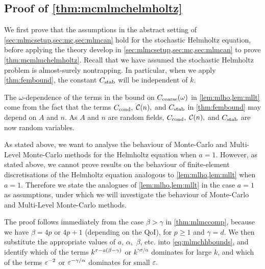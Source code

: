 \subsection{Proof of \cref{thm:mcmlmchelmholtz}}
We first prove that the assumptions in the abstract setting of \cref{sec:mlmcsetup,sec:mc,sec:mlmcan} hold for the stochastic Helmholtz equation, before applying the theory develop in \cref{sec:mlmcsetup,sec:mc,sec:mlmcan} to prove \cref{thm:mcmlmchelmholtz}. Recall that we have assumed the stochastic Helmholtz problem is almost-surely nontrapping. In particular, when we apply \cref{thm:fembound}, the constant $C_{\mathrm{stab}}$ will be independent of $k.$

The $\omega$-dependence of the terms in the bound on $C_{\mathrm{coarse}}(\omega)$ in \cref{lem:mlho,lem:mllt} come from the fact that the terms $C_{\mathrm{cond}},$ $\mathcal C(n),$ and $C_{\mathrm{stab}}$ in \cref{thm:fembound} may depend on $A$ and $n$. As $A$ and $n$ are random fields, $C_{\mathrm{cond}},$ $\mathcal C(n),$ and $C_{\mathrm{stab}}$ are now random variables.
\ere

As stated above, we want to analyse the behaviour of Monte-Carlo and Multi-Level Monte-Carlo methods for the Helmholtz equation when $a=1.$ However, as stated above, we cannot prove results on the behaviour of finite-element discretisations of the Helmholtz equation analogous to \cref{lem:mlho,lem:mllt} when $a=1.$ Therefore we state the analogues of \cref{lem:mlho,lem:mllt} in the case $a=1$ as assumptions, under which we will investigate the behaviour of Monte-Carlo and Multi-Level Monte-Carlo methods.




\label{page:mcmlmchelmholtzproof}
The proof follows immediately from the case $\beta > \gamma$ in \cref{thm:mlmccomp}, because we have $\beta = 4p$ or $4p+1$  (depending on the QoI), for $p\geq 1$ and $\gamma=d.$ We then substitute the appropriate values of $a$, $\alpha,$ $\beta$, etc. into \cref{eq:mlmchhbounds}, and identify which of the terms $k^{\tau - a\mleft(\beta-\gamma\mright)}$ or $k^{\gamma\sigma/\alpha}$ dominates for large $k$, and which of the terms $\varepsilon^{-2}$ or $\varepsilon^{-\gamma/\alpha}$ dominates for small $\varepsilon.$

